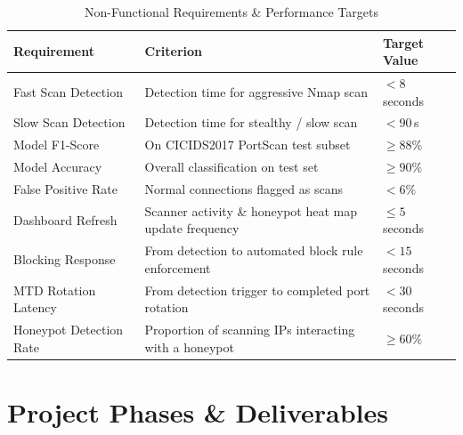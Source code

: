 \documentclass[12pt,a4paper]{report}
\begin{document}
\begin{table}[h!]
\centering
\caption{Non-Functional Requirements \& Performance Targets}
\begin{tabular}{@{}L{4.5cm} L{6cm} C{3.5cm}@{}}
  \toprule
  \textbf{Requirement} & \textbf{Criterion} & \textbf{Target Value} \\
  \midrule
  Fast Scan Detection    & Detection time for aggressive Nmap scan                   & $< 8$ seconds \\
  Slow Scan Detection    & Detection time for stealthy / slow scan                   & $< 90$\,s \\
  Model F1-Score         & On CICIDS2017 PortScan test subset                        & $\geq 88\%$ \\
  Model Accuracy         & Overall classification on test set                        & $\geq 90\%$ \\
  False Positive Rate    & Normal connections flagged as scans                       & $< 6\%$ \\
  Dashboard Refresh      & Scanner activity \& honeypot heat map update frequency    & $\leq 5$ seconds \\
  Blocking Response      & From detection to automated block rule enforcement        & $< 15$ seconds \\
  MTD Rotation Latency   & From detection trigger to completed port rotation         & $< 30$ seconds \\
  Honeypot Detection Rate & Proportion of scanning IPs interacting with a honeypot  & $\geq 60\%$ \\
  \bottomrule
\end{tabular}
\label{tab:nfr}
\end{table}

\chapter{Project Phases \& Deliverables}
\end{document}
